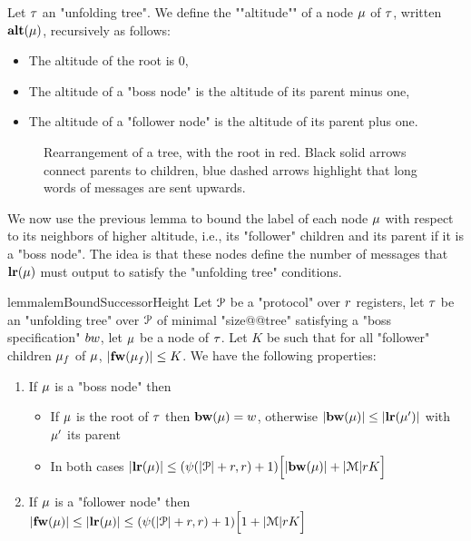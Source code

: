 \begin{definition}
	Let $\tau$ an "unfolding tree". We define the ""altitude"" of a node $\mu$ of $\tau$, written $\mathbf{alt}(\mu)$, recursively as follows:
	\begin{itemize}
		\item The altitude of the root is $0$,
		\item The altitude of a "boss node" is the altitude of its parent minus one,
		\item The altitude of a "follower node" is the altitude of its parent plus one.
	\end{itemize}
\end{definition}

\begin{figure}[h]
	
	\caption{Rearrangement of a tree, with the root in red. Black solid arrows connect parents to children, blue dashed arrows highlight that long words of messages are sent upwards.}
	\label{fig:rearrange-tree}
\end{figure}

We now use the previous lemma to bound the label of each node $\mu$ with respect to its neighbors of higher altitude, i.e., its "follower" children and its parent if it is a "boss node". The idea is that these nodes define the number of messages that $\mathbf{lr}(\mu)$ must output to satisfy the "unfolding tree" conditions.

\begin{restatable}{lemma}{lemBoundSuccessorHeight}
	\label{lem:bound-successor-height}
	Let $\mathcal{P}$ be a "protocol" over $r$ registers, let $\tau$ be an "unfolding tree" over $\mathcal{P}$ of minimal "size@@tree" satisfying a "boss specification" $\bossspec$, let $\mu$ be a node of $\tau$.
	Let $K$ be such that for all "follower" children $\mu_f$ of $\mu$, $|\mathbf{fw}(\mu_f)| \leq K$.
	We have the following properties:
	
	\begin{enumerate}				
		\item  If $\mu$ is a "boss node" then 
		\begin{itemize}
			\item If $\mu$ is the root of $\tau$ then $\mathbf{bw}(\mu) = w$, otherwise $|\mathbf{bw}(\mu)| \leq |\mathbf{lr}(\mu')|$ with $\mu'$ its parent
			
			\item In both cases $|\mathbf{lr}(\mu)| \leq (\psi(|\mathcal{P}|+r,r) + 1)\Big[ |\mathbf{bw}(\mu)| + |\mathcal{M}|rK \Big]$
		\end{itemize}
		
		\item If $\mu$ is a "follower node" then  $|\mathbf{fw}(\mu)| \leq |\mathbf{lr}(\mu)| \leq (\psi(|\mathcal{P}|+r,r) +1)\Big[ 1 + |\mathcal{M}|rK \Big]$
			
	\end{enumerate}
\end{restatable}

